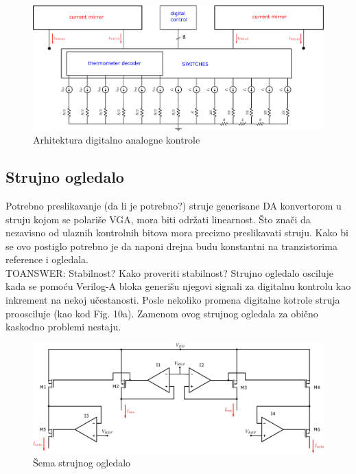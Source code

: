 \documentclass[journal,twocolumn,letterpaper]{IEEEJERM}
\begin{document}
\begin{figure}[!htbp]
  \centering
  \includegraphics[width=\linewidth]{dac_core.pdf}
  \caption{Arhitektura digitalno analogne kontrole}
  \label{fig:dac_core}
\end{figure}

\subsection{Strujno ogledalo}

Potrebno preslikavanje (da li je potrebno?) struje generisane DA konvertorom u struju kojom se polariše VGA, mora biti održati linearnost. Što znači da nezavisno od ulaznih kontrolnih bitova mora precizno preslikavati struju. Kako bi se ovo postiglo potrebno je da naponi drejna budu konstantni na tranzistorima reference i ogledala. \\

TOANSWER:
Stabilnost? Kako proveriti stabilnost? Strujno ogledalo osciluje kada se pomoću Verilog-A bloka generišu njegovi signali za digitalnu kontrolu kao inkrement na nekoj učestanosti. Posle nekoliko promena digitalne kotrole struja proosciluje (kao kod \cite{zeki07} Fig. 10a). Zamenom ovog strujnog ogledala za obično kaskodno problemi nestaju.

\begin{figure}[!htbp]
  \centering
  \includegraphics[width=\linewidth]{mirror_detail.pdf}
  \caption{Šema strujnog ogledalo}
  \label{fig:mirror_detail}
\end{figure}
\end{document}
